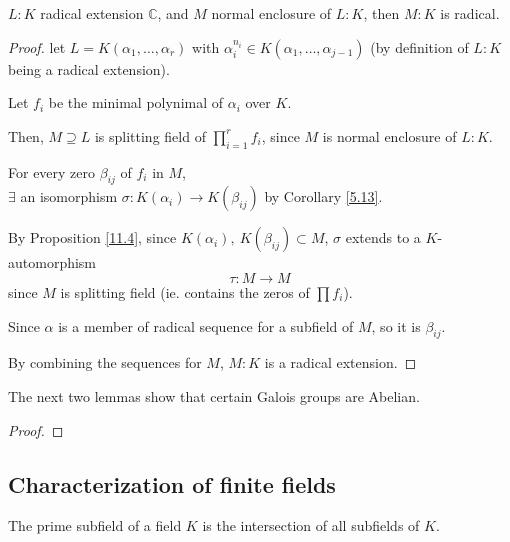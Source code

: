 \documentclass{article}
\theoremstyle{definition}
\newenvironment{defn}[1]
{\renewcommand\theinnerdefn{#1}\innerdefn}
{\endinnerdefn}
\newenvironment{lemma}[1]
{\renewcommand\theinnerlemma{#1}\innerlemma}
{\endinnerlemma}
\begin{document}
\begin{lemma}{15.3}
  $L:K$ radical extension $\mathbb{C}$, and $M$ normal enclosure of $L:K$, then $M:K$ is radical.
\end{lemma}
\begin{proof}
  let $L=K(\alpha_1, \ldots, \alpha_r)$ with $\alpha_i^{n_i} \in K(\alpha_1, \ldots, \alpha_{j-1})$ (by definition of $L:K$ being a radical extension).

  Let $f_i$ be the minimal polynimal of $\alpha_i$ over $K$.

  Then, $M \supseteq L$ is splitting field of $\prod_{i=1}^r f_i$, since $M$ is normal enclosure of $L:K$.

  For every zero $\beta_{ij}$ of $f_i$ in $M$,\\
  $\exists$ an isomorphism $\sigma: K(\alpha_i) \longrightarrow K(\beta_{ij})$ by Corollary \ref{5.13}.

  By Proposition \ref{11.4}, since $K(\alpha_i),~K(\beta_{ij}) \subset M$,
  $\sigma$ extends to a $K$-automorphism
  $$\tau: M \longrightarrow M$$
  since $M$ is splitting field (ie. contains the zeros of $\prod f_i$).

  Since $\alpha$ is a member of radical sequence for a subfield of $M$, so it is $\beta_{ij}$.

  By combining the sequences for $M$, $M:K$ is a radical extension.
\end{proof}


\vspace{0.5cm}

The next two lemmas show that certain Galois groups are Abelian.

\begin{lemma}{15.4}
\end{lemma}
\begin{proof}
\end{proof}

\newpage

\subsection{Characterization of finite fields}

\begin{defn}{16.8}
The prime subfield of a field $K$ is the intersection of all subfields of $K$. 
\end{defn}
\end{document}

